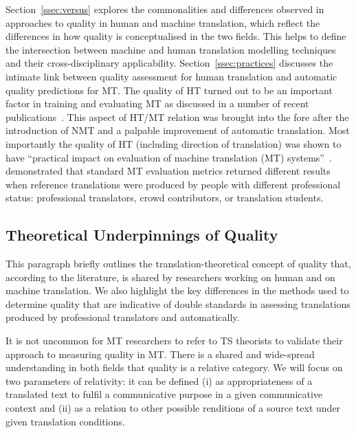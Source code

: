 Section~\ref{ssec:versus} explores the commonalities and differences observed in approaches to quality in human and machine translation, which reflect the differences in how quality is conceptualised in the two fields. This helps to define the intersection between machine and human translation modelling techniques and their cross-disciplinary applicability.
Section~\ref{ssec:practices} discusses the intimate link between quality assessment for human translation and automatic quality predictions for MT. The quality of HT turned out to be an important factor in training and evaluating MT as discussed in a number of recent publications~\cite[see, for example,][]{Popovic2020, Laubli2020}. This aspect of HT/MT relation was brought into the fore after the introduction of NMT and a palpable improvement of automatic translation. Most importantly the quality of HT (including direction of translation) was shown to have ``practical impact on evaluation of machine translation (MT) systems''~\cite[p.365]{Popovic2020}. \citet{Popovic2020} demonstrated that standard MT evaluation metrics returned different results when reference translations were produced by people with different professional status: professional translators, crowd contributors, or translation students.

\subsection{\label{ssec:theory}Theoretical Underpinnings of Quality} 

This paragraph briefly outlines the translation-theoretical concept of quality that, according to the literature, is shared by researchers working on human and on machine translation. We also highlight the key differences in the methods used to determine quality that are indicative of double standards in assessing translations produced by professional translators and automatically. 

It is not uncommon for MT researchers to refer to TS theorists to validate their approach to measuring quality in MT. There is a shared and wide-spread understanding in both fields that quality is a relative category. We will focus on two parameters of \hypertarget{wd:relativity}{relativity}: it can be defined (i) as appropriateness of a translated text to fulfil a communicative purpose in a given communicative context and (ii) as a relation to other possible renditions of a source text under given translation conditions.

